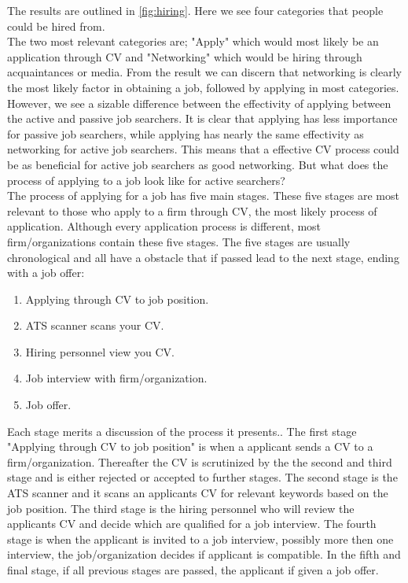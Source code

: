 The results are outlined in \vref{fig:hiring}.
\newpage
Here we see four categories that people could be hired from. \\
The two most relevant categories are; "Apply" which would most likely be an application through CV and "Networking" which would be hiring through acquaintances or media.
From the result we can discern that networking is clearly the most likely factor in obtaining a job, followed by applying in most categories.
However, we see a sizable difference between the effectivity of applying between the active and passive job searchers. 
It is clear that applying has less importance for passive job searchers, while applying has nearly the same effectivity as networking for active job searchers. 
This means that a effective CV process could be as beneficial for active job searchers as good networking.
But what does the process of applying to a job look like for active searchers? \\

The process of applying for a job has five main stages.
These five stages are most relevant to those who apply to a firm through CV, the most likely process of application.
Although every application process is different, most firm/organizations contain these five stages.
The five stages are usually chronological and all have a obstacle that if passed lead to the next stage, ending with a job offer:
\begin{enumerate}
   \item Applying through CV to job position.
   \item ATS scanner scans your CV.
   \item Hiring personnel view you CV.
   \item Job interview with firm/organization.
   \item Job offer.\cite{Process_steps_unemployment}
\end{enumerate}
Each stage merits a discussion of the process it presents..
The first stage "Applying through CV to job position" is when a applicant sends a CV to a firm/organization.
Thereafter the CV is scrutinized by the the second and third stage and is either rejected or accepted to further stages.
The second stage is the ATS scanner and it scans an applicants CV for relevant keywords based on the job position.
The third stage is the hiring personnel who will review the applicants CV and decide which are qualified for a job interview.
The fourth stage is when the applicant is invited to a job interview, possibly more then one interview, the job/organization decides if applicant is compatible.
In the fifth and final stage, if all previous stages are passed, the applicant if given a job offer. \\

